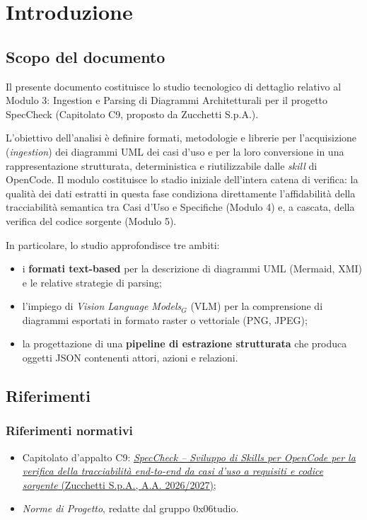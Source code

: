 \documentclass[a4paper, 11pt]{article}
\newcommand{\term}[1]{\textit{#1}$_G$} %
\begin{document}
\newpage
\tableofcontents
\newpage

\section{Introduzione}

\subsection{Scopo del documento}
Il presente documento costituisce lo studio tecnologico di dettaglio relativo al Modulo 3: Ingestion e Parsing di Diagrammi Architetturali per il progetto SpecCheck (Capitolato C9, proposto da Zucchetti S.p.A.).

L'obiettivo dell'analisi è definire formati, metodologie e librerie per l'acquisizione (\textit{ingestion}) dei diagrammi UML dei casi d'uso e per la loro conversione in una rappresentazione strutturata, deterministica e riutilizzabile dalle \textit{skill} di OpenCode. Il modulo costituisce lo stadio iniziale dell'intera catena di verifica: la qualità dei dati estratti in questa fase condiziona direttamente l'affidabilità della tracciabilità semantica tra Casi d'Uso e Specifiche (Modulo 4) e, a cascata, della verifica del codice sorgente (Modulo 5).

In particolare, lo studio approfondisce tre ambiti:
\begin{itemize}[noitemsep]
    \item i \textbf{formati text-based} per la descrizione di diagrammi UML (Mermaid, XMI) e le relative strategie di parsing;
    \item l'impiego di \term{Vision Language Models} (VLM) per la comprensione di diagrammi esportati in formato raster o vettoriale (PNG, JPEG);
    \item la progettazione di una \textbf{pipeline di estrazione strutturata} che produca oggetti JSON contenenti attori, azioni e relazioni.
\end{itemize}

\subsection{Riferimenti}
\subsubsection{Riferimenti normativi}
\begin{itemize}[noitemsep]
    \item Capitolato d'appalto C9: \href{https://www.math.unipd.it/~tullio/IS-1/2026/Progetto/C9-SpecCheck.pdf}{\textit{SpecCheck -- Sviluppo di Skills per OpenCode per la verifica della tracciabilità end-to-end da casi d'uso a requisiti e codice sorgente} (Zucchetti S.p.A., A.A. 2026/2027)};
    \item \textit{Norme di Progetto}, redatte dal gruppo 0x06tudio.
\end{itemize}
\end{document}
